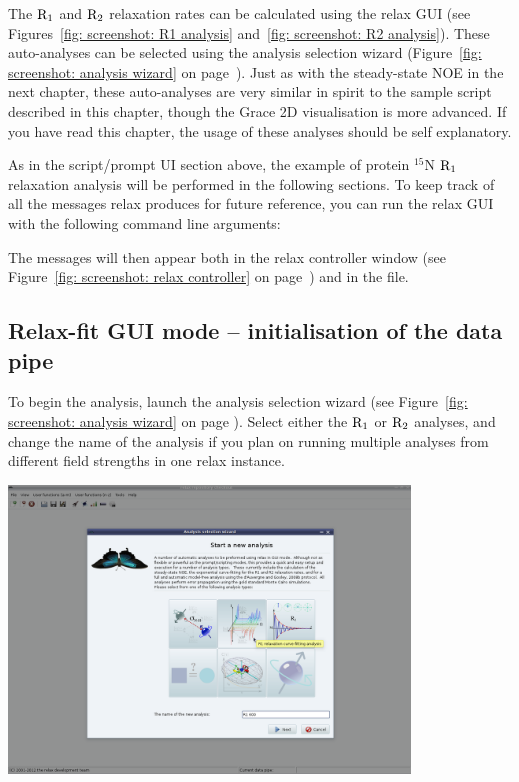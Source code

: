 The $\mathrm{R}_1$ and $\mathrm{R}_2$ relaxation rates can be calculated using the relax GUI (see Figures~\ref{fig: screenshot: R1 analysis} and~\ref{fig: screenshot: R2 analysis}).  These auto-analyses can be selected using the analysis selection wizard (Figure~\ref{fig: screenshot: analysis wizard} on page~\pageref{fig: screenshot: analysis wizard}).  Just as with the steady-state NOE in the next chapter, these auto-analyses are very similar in spirit to the sample script described in this chapter, though the Grace 2D visualisation is more advanced.  If you have read this chapter, the usage of these analyses should be self explanatory.

As in the script/prompt UI section above, the example of protein $^{15}$N $\mathrm{R}_1$ relaxation analysis will be performed in the following sections.  To keep track of all the messages relax produces for future reference, you can run the relax GUI with the following command line arguments:


The messages will then appear both in the relax controller window (see Figure~\ref{fig: screenshot: relax controller} on page~\pageref{fig: screenshot: relax controller}) and in the  file.



\subsection{Relax-fit GUI mode -- initialisation of the data pipe}

To begin the analysis, launch the analysis selection wizard (see Figure~\ref{fig: screenshot: analysis wizard} on page \pageref{fig: screenshot: analysis wizard}).  Select either the $\mathrm{R}_1$ or $\mathrm{R}_2$ analyses, and change the name of the analysis if you plan on running multiple analyses from different field strengths in one relax instance.

\begin{minipage}[h]{\linewidth}
\centerline{\includegraphics[width=0.8\textwidth, bb=14 14 1415 1019]{graphics/screenshots/r1_analysis/analysis_wizard1}}
\end{minipage}

